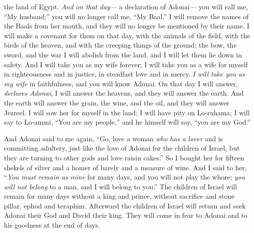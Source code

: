 \begin{biblechapter}
the land of Egypt.
\verse \textit{And on that day}— 
a declaration of Adonai— 
you will call me, “My husband;” 
you will no longer call me, “My Baal.”
\verse I will remove the names 
of the Baals from her mouth, 
and they will no longer be mentioned by their name.
\verse I will make a covenant for them on that day, 
with the animals of the field, 
with the birds of the heaven, and 
with the creeping things of the ground; 
the bow, the sword, and the war I will abolish from the land, and I will let them lie down in safety.
\verse And I will take you as my wife forever; 
I will take you as a wife for myself in righteousness and in justice, 
in steadfast love and in mercy.
\verse \textit{I will take you as my wife} in faithfulness, 
and you will know Adonai.
\verse On that day I will answer, \textit{declares Adonai}, 
I will answer the heavens, 
and they will answer the earth.
\verse And the earth will answer 
the grain, the wine, and the oil, 
and they will answer Jezreel.
\verse I will sow her for myself in the land; 
I will have pity on Lo-ruhama; 
I will say to Lo-ammi, 
“You are my people,” 
and he himself will say, “you are my God.”
\end{biblechapter}

\begin{biblechapter} %
 And Adonai said to me again, 
“Go, love a woman 
\textit{who has a lover} and is committing adultery, 
just like the love of Adonai for the children of Israel, 
but they are turning to other gods 
and love raisin cakes.”
\verse So I bought her for fifteen shekels of silver 
and a homer of barely and a measure of wine.
\verse And I said to her, 
“\textit{You must remain as mine} for many days, 
and you will not play the whore; 
\textit{you will not belong} to a man, 
and I will belong to you.”
\verse The children of Israel will remain for many days 
without a king and prince, 
without sacrifice and stone pillar, ephod and teraphim.
\verse Afterward the children of Israel will return 
and seek Adonai their God and David their king. 
They will come in fear to Adonai 
and to his goodness at the end of days.
\end{biblechapter}

